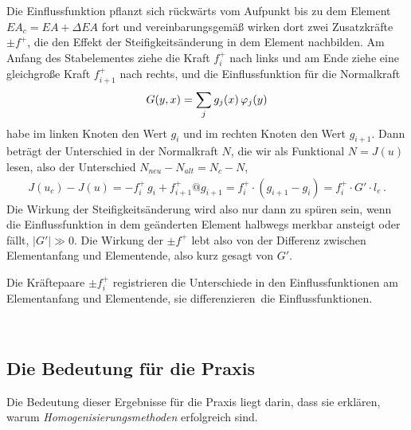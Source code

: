 {{Die Einflussfunktion pflanzt sich r\"{u}ckw\"{a}rts vom Aufpunkt bis zu dem Element $EA_c = EA + \Delta EA$ fort und vereinbarungsgem\"{a}{\ss} wirken dort zwei Zusatzkr\"{a}fte $\pm f^+$, die den Effekt der Steifigkeits\"{a}nderung in dem Element nachbilden. Am Anfang des Stabelementes ziehe die Kraft $f_{i}^+$ nach links und am Ende ziehe eine gleichgro{\ss}e Kraft $f_{i+1}^+$ nach rechts, und die Einflussfunktion f\"{u}r die Normalkraft
\begin{align}
G(y,x) = \sum_j g_j(x)\,\varphi_j(y)
\end{align}
habe im linken Knoten den Wert $g_{i}$ und im rechten Knoten den Wert $g_{i+1}$. Dann betr\"{a}gt der  Unterschied in der Normalkraft $N$, die wir als Funktional $N = J(u)$ lesen, also der Unterschied $N_{neu} - N_{alt} = N_c - N$,
\begin{align}
J(u_c) - J(u) = -f_{i}^+\, g_{i} + f_{i+1}^+ @g_{i+1} = f_i^+ \cdot (g_{i+1} - g_{i}) = f_i^+ \cdot G'\cdot l_e\,.
\end{align}
Die Wirkung der Steifigkeits\"{a}nderung wird also nur dann zu sp\"{u}ren sein, wenn die Einflussfunktion
in dem ge\"{a}nderten Element halbwegs merkbar ansteigt oder f\"{a}llt, $|G'| \gg 0$. Die Wirkung der $\pm f^+$ lebt also von der Differenz zwischen Elementanfang und Elementende, also kurz gesagt von $G'$.\\

\hspace*{-12pt}\colorbox{highlightBlue}{\parbox{0.98\textwidth}{Die Kr\"{a}ftepaare $\pm f_i^+$ registrieren die Unterschiede in den Einflussfunktionen am Elementanfang und Elementende, sie \glq differenzieren\grq\ die Einflussfunktionen. }}\\


\textcolor{sectionTitleBlue}{\section{Die Bedeutung f\"{u}r die Praxis}}
Die Bedeutung dieser Ergebnisse f\"{u}r die Praxis liegt darin, dass sie erkl\"{a}ren, warum {\em Homogenisierungsmethoden\/} erfolgreich sind.

}}
